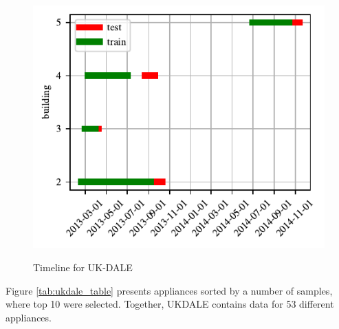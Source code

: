 \begin{figure}[H]
	\centering
	\caption{Timeline for UK-DALE}
	\includegraphics[]{Figures/EC/ukdale_timeline.pdf}
	\label{fig:ukdale_timeline}
\end{figure}

Figure \ref{tab:ukdale_table} presents appliances sorted by a number of samples, where top 10 were selected.
Together, UKDALE contains data for 53 different appliances.

